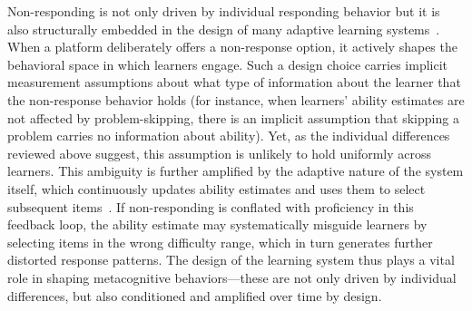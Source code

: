 \documentclass[12pt]{article}
\begin{document}
Non-responding is not only driven by individual responding behavior but it is also structurally embedded in the design of many adaptive learning systems~\parencite{corbett1995knowledge, aleven2000limitations, vanlehn2011relative, roll2015understanding}. When a platform deliberately offers a non-response option, it actively shapes the behavioral space in which learners engage. Such a design choice carries implicit measurement assumptions about what type of information about the learner that the non-response behavior holds (for instance, when learners' ability estimates are not affected by problem-skipping, there is an implicit assumption that skipping a problem carries no information about ability). Yet, as the individual differences reviewed above suggest, this assumption is unlikely to hold uniformly across learners. This ambiguity is further amplified by the adaptive nature of the system itself, which continuously updates ability estimates and uses them to select subsequent items~\parencite{van2010elements}. If non-responding is conflated with proficiency in this feedback loop, the ability estimate may systematically misguide learners by selecting items in the wrong difficulty range, which in turn generates further distorted response patterns. 
The design of the learning system thus plays a vital role in shaping metacognitive behaviors---these are not only driven by individual differences, but also conditioned and amplified over time by design. %

\end{document}
